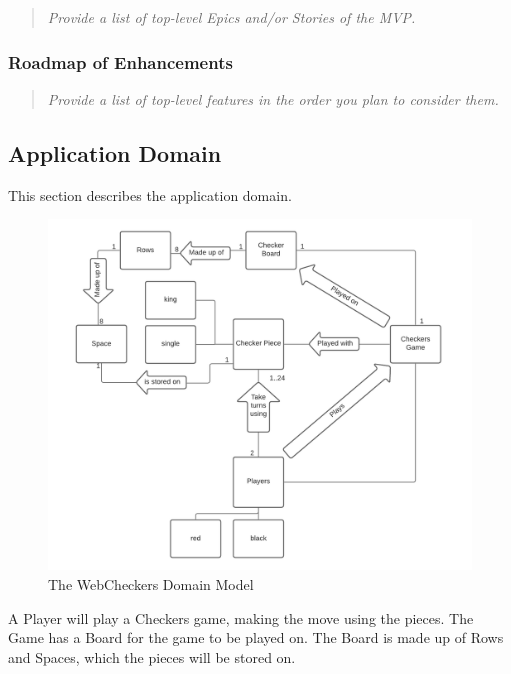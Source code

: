 \begin{quote}
\emph{Provide a list of top-level Epics and/or Stories of the MVP.}
\end{quote}

\hypertarget{roadmap-of-enhancements}{%
\subsubsection{Roadmap of Enhancements}\label{roadmap-of-enhancements}}

\begin{quote}
\emph{Provide a list of top-level features in the order you plan to
consider them.}
\end{quote}

\hypertarget{application-domain}{%
\subsection{Application Domain}\label{application-domain}}

This section describes the application domain.

\begin{figure}
\centering
\includegraphics{domain-model.png}
\caption{The WebCheckers Domain Model}
\end{figure}

A Player will play a Checkers game, making the move using the pieces.
The Game has a Board for the game to be played on. The Board is made up
of Rows and Spaces, which the pieces will be stored on.

